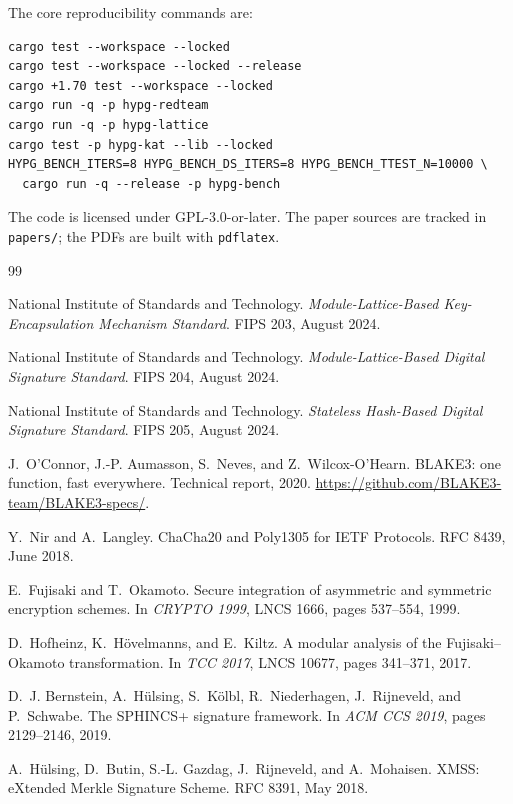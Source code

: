 \documentclass[11pt,a4paper]{article}
\theoremstyle{plain}
\theoremstyle{definition}
\theoremstyle{remark}
\begin{document}
The core reproducibility commands are:

\begin{verbatim}
cargo test --workspace --locked
cargo test --workspace --locked --release
cargo +1.70 test --workspace --locked
cargo run -q -p hypg-redteam
cargo run -q -p hypg-lattice
cargo test -p hypg-kat --lib --locked
HYPG_BENCH_ITERS=8 HYPG_BENCH_DS_ITERS=8 HYPG_BENCH_TTEST_N=10000 \
  cargo run -q --release -p hypg-bench
\end{verbatim}

The code is licensed under GPL-3.0-or-later.  The paper sources are
tracked in \texttt{papers/}; the PDFs are built with \texttt{pdflatex}.

\begin{thebibliography}{99}

National Institute of Standards and Technology.
\newblock \emph{Module-Lattice-Based Key-Encapsulation Mechanism
Standard}. FIPS 203, August 2024.

National Institute of Standards and Technology.
\newblock \emph{Module-Lattice-Based Digital Signature Standard}.
FIPS 204, August 2024.

National Institute of Standards and Technology.
\newblock \emph{Stateless Hash-Based Digital Signature Standard}.
FIPS 205, August 2024.

J.~O'Connor, J.-P. Aumasson, S.~Neves, and Z.~Wilcox-O'Hearn.
\newblock BLAKE3: one function, fast everywhere.
\newblock Technical report, 2020.
\newblock \url{https://github.com/BLAKE3-team/BLAKE3-specs/}.

Y.~Nir and A.~Langley.
\newblock ChaCha20 and Poly1305 for IETF Protocols.
\newblock RFC 8439, June 2018.

E.~Fujisaki and T.~Okamoto.
\newblock Secure integration of asymmetric and symmetric encryption
schemes.
\newblock In \emph{CRYPTO 1999}, LNCS 1666, pages 537--554, 1999.

D.~Hofheinz, K.~H\"ovelmanns, and E.~Kiltz.
\newblock A modular analysis of the Fujisaki--Okamoto transformation.
\newblock In \emph{TCC 2017}, LNCS 10677, pages 341--371, 2017.

D.~J. Bernstein, A.~H\"ulsing, S.~K\"olbl, R.~Niederhagen,
J.~Rijneveld, and P.~Schwabe.
\newblock The SPHINCS+ signature framework.
\newblock In \emph{ACM CCS 2019}, pages 2129--2146, 2019.

A.~H\"ulsing, D.~Butin, S.-L. Gazdag, J.~Rijneveld, and A.~Mohaisen.
\newblock XMSS: eXtended Merkle Signature Scheme.
\newblock RFC 8391, May 2018.


\end{thebibliography}
\end{document}
